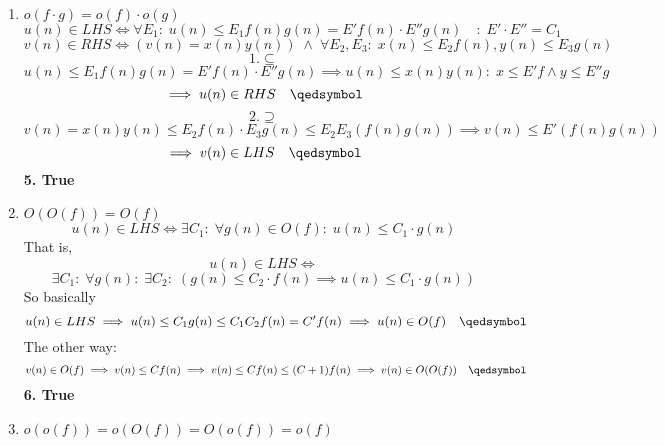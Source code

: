 \begin{enumerate}
    \item $o(f\cdot g) = o(f) \cdot o(g)$
        $$u(n) \in LHS \iff \forall E_1:\; u(n) \le E_1 f(n) g(n) = E' f(n) \cdot E'' g(n) \quad :\; E'\cdot E'' = C_1$$
        $$v(n) \in RHS \iff (v(n) = x(n)y(n)) \;\wedge\; \forall E_2, E_3:\; x(n) \le E_2 f(n), y(n) \le E_3 g(n) \quad$$
        $$1. \subseteq$$
        $$ u(n) \le E_1 f(n) g(n) = E' f(n) \cdot E'' g(n) \implies u(n) \le x(n) y(n) :\; x \le E' f \wedge y \le E'' g$$
        $$ \implies u(n) \in RHS\quad  \qedsymbol$$
        $$2. \supseteq$$
        $$v(n) = x(n)y(n) \le E_2 f(n) \cdot E_3 g(n) \le E_2 E_3 (f(n) g(n)) \implies v(n) \le E' (f(n)g(n))$$
        $$ \implies v(n) \in LHS\quad  \qedsymbol$$
        \qedsymbol \textbf{5. True}\\
        \hrulefill

    \item $O(O(f)) = O(f)$
        $$u(n) \in LHS \iff \exists C_1 :\; \forall g(n) \in O(f) :\; u(n) \le C_1 \cdot g(n)$$
        That is,
        $$u(n) \in LHS \iff $$
        $$\exists C_1 :\; \forall g(n) :\; \exists C_2 :\; (g(n) \le C_2 \cdot f(n) \implies u(n) \le C_1 \cdot g(n))$$
        So basically 
        $$u(n) \in LHS \implies u(n) \le C_1 g(n) \le C_1 C_2 f(n) = C' f(n) 
        \implies u(n) \in O(f) \quad \qedsymbol$$
        The other way:
        $$v(n) \in O(f) \implies v(n) \le C f(n) \implies v(n) \le C f(n) \le (C+1) f(n) 
        \implies v(n) \in O(O(f)) \quad \qedsymbol$$
        \qedsymbol \textbf{6. True}\\
        \hrulefill

    \item $o(o(f)) = o(O(f)) = O(o(f)) = o(f)$

\end{enumerate}
